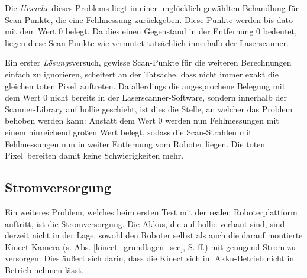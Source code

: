 Die \emph{Ursache} dieses Problems liegt in einer unglücklich gewählten Behandlung für Scan-Punkte, die eine Fehlmessung zurückgeben.
Diese Punkte werden bis dato mit dem Wert 0 belegt.
Da dies einen Gegenstand in der Entfernung 0 bedeutet, liegen diese Scan-Punkte wie vermutet tatsächlich innerhalb der Laserscanner.

Ein erster \emph{Lösung}sversuch, gewisse Scan-Punkte für die weiteren Berechnungen einfach zu ignorieren, scheitert an der Tatsache, dass nicht immer exakt die gleichen \glqq toten Pixel\grqq\ auftreten.
Da allerdings die angesprochene Belegung mit dem Wert 0 nicht bereits in der Laserscanner-Software, sondern innerhalb der Scanner-Library auf \gls{hollie} geschieht, ist dies die Stelle, an welcher das Problem behoben werden kann:
Anstatt dem Wert 0 werden nun Fehlmessungen mit einem hinreichend großen Wert belegt, sodass die Scan-Strahlen mit Fehlmessungen nun in weiter Entfernung vom Roboter liegen.
Die \glqq toten Pixel\grqq\ bereiten damit keine Schwierigkeiten mehr.





\subsection{Stromversorgung}

Ein weiteres Problem, welches beim ersten Test mit der realen Roboterplattform auftritt, ist die Stromversorgung.
Die Akkus, die auf \gls{hollie} verbaut sind, sind derzeit nicht in der Lage, sowohl den Roboter selbst als auch die darauf montierte Kinect-Kamera (s. Abs. \ref{kinect_grundlagen_sec}, S. \pageref{kinect_grundlagen_sec} ff.) mit genügend Strom zu versorgen.
Dies äußert sich darin, dass die Kinect sich im Akku-Betrieb nicht in Betrieb nehmen lässt.

